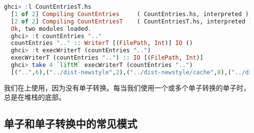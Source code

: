 \documentclass[./main.tex]{subfiles}
\begin{document}
\begin{lstlisting}[language=Haskell]
  ghci> :l CountEntriesT.hs
  [1 of 2] Compiling CountEntries     ( CountEntries.hs, interpreted )
  [2 of 2] Compiling CountEntriesT    ( CountEntriesT.hs, interpreted )
  Ok, two modules loaded.
  ghci> :t countEntries ".."
  countEntries ".." :: WriterT [(FilePath, Int)] IO ()
  ghci> :t execWriterT (countEntries "..")
  execWriterT (countEntries "..") :: IO [(FilePath, Int)]
  ghci> take 4 `liftM` execWriterT (countEntries "..")
  [("..",6),("../dist-newstyle",2),("../dist-newstyle/cache",8),("../dist-newstyle/tmp",0)]
\end{lstlisting}

我们在上使用，因为没有单子转换。每当我们使用一个或多个单子转换的单子时，总是在堆栈的底部。

\subsection*{单子和单子转换中的常见模式}

%

\begin{lstlisting}[language=Haskell]

\end{lstlisting}



\begin{lstlisting}[language=Haskell]

\end{lstlisting}



\begin{lstlisting}[language=Haskell]

\end{lstlisting}



\begin{lstlisting}[language=Haskell]

\end{lstlisting}



\begin{lstlisting}[language=Haskell]

\end{lstlisting}



\begin{lstlisting}[language=Haskell]

\end{lstlisting}
\end{document}
